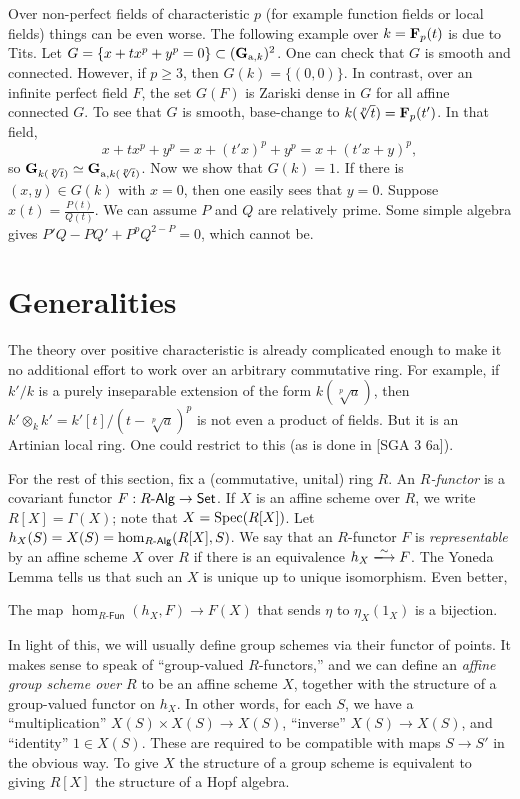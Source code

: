 \documentclass{article}
\begin{document}
Over non-perfect fields of characteristic $p$ (for example function fields or 
local fields) things can be even worse. The following example over 
$k=\mathbf{F}_p(t)$ is due to Tits. Let 
$G=\{x+t x^p+y^p=0\}\subset (\mathbf{G}_{\mathrm{a},k})^2$. One can check that $G$ is 
smooth and connected. However, if $p\geqslant 3$, then 
$G(k)=\{(0,0)\}$. In contrast, over an infinite perfect field $F$, the set 
$G(F)$ is Zariski dense in $G$ for all affine connected $G$. To see that 
$G$ is smooth, base-change to $k(\sqrt[p] t)=\mathbf{F}_p(t')$. In that field, 
\[
  x+t x^p+y^p = x+(t'x)^p + y^p = x+(t'x+y)^p ,
\]
so $\mathbf{G}_{k(\sqrt[p] t)}\simeq \mathbf{G}_{\mathrm{a},k(\sqrt[p] t)}$. Now we show 
that $G(k)=1$. If there is $(x,y)\in G(k)$ with $x=0$, then one easily sees 
that $y=0$. Suppose $x(t)=\frac{P(t)}{Q(t)}$. We can assume $P$ and $Q$ are 
relatively prime. Some simple algebra gives $P' Q-P Q' + P^p Q^{2-P} = 0$, 
which cannot be. 





\section{Generalities}

The theory over positive characteristic is already complicated enough to make 
it no additional effort to work over an arbitrary commutative ring. For 
example, if $k'/k$ is a purely inseparable extension of the form 
$k(\sqrt[p] a)$, then $k'\otimes_k k' = k'[t]/(t-\sqrt[p] a)^p$ is not even 
a product of fields. But it is an Artinian local ring. One could restrict to 
this (as is done in [SGA 3 6a]). 

For the rest of this section, fix a (commutative, unital) ring $R$. An 
\emph{$R$-functor} is a covariant functor 
$F:R\text{-}\mathsf{Alg}\to \mathsf{Set}$. If $X$ is an affine scheme over $R$, we write 
$R[X]=\Gamma(X)$; note that $X=\operatorname{Spec}(R[X])$. Let 
$h_X(S)=X(S)=\hom_{R\text{-}\mathsf{Alg}}(R[X],S)$. We say that an $R$-functor $F$ is 
\emph{representable} by an affine scheme $X$ over $R$ if there is an 
equivalence $h_X \isomorphism F$. The Yoneda Lemma tells us that such an $X$ is 
unique up to unique isomorphism. Even better, 

\begin{lemma}[Yoneda]
The map $\hom_{R\text{-}\mathsf{Fun}}(h_X,F) \to F(X)$ that sends 
$\eta$ to $\eta_X(1_X)$ is a bijection. 
\end{lemma}

In light of this, we will usually define group schemes via their functor of 
points. It makes sense to speak of ``group-valued $R$-functors,'' and we can 
define an \emph{affine group scheme over $R$} to be an affine scheme $X$, 
together with the structure of a group-valued functor on $h_X$. In other words, 
for each $S$, we have a ``multiplication'' $X(S)\times X(S) \to X(S)$, 
``inverse'' $X(S) \to X(S)$, and ``identity'' $1\in X(S)$. These are required 
to be compatible with maps $S\to S'$ in the obvious way. To give $X$ the 
structure of a group scheme is equivalent to giving $R[X]$ the structure of a 
Hopf algebra. 
\end{document}
